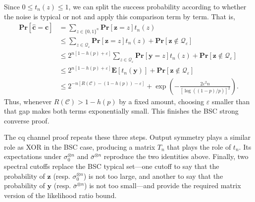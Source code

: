 \documentclass[11pt]{article}
\renewcommand{\leq}{\leqslant}
\theoremstyle{remark}
\newcommand{\cC}{\mathcal{C}}
\newcommand{\Eb}{\mathbf{E}}
\newcommand{\Prb}{\mathbf{Pr}}
\newcommand{\bits}{\{0,1\}}
\newcommand{\bchat}{\hat{\mathbf{c}}}
\newcommand{\bc}{\mathbf{c}}
\newcommand{\by}{\mathbf{y}}
\newcommand{\bz}{\mathbf{z}}
\newcommand{\eps}{\varepsilon}
\begin{document}
Since $0\leq t_n(z)\leq1$, we can split the success probability according to whether the noise is typical or not and apply this comparison term by term. That is,
\begin{align*}
\Prb[\bchat=\bc]
&=\sum_{z\in\bits^n}{\Prb[\bz=z]t_n(z)} \\
&\leq
\sum_{z\in\mathcal{Q}_\eps}{\Prb[\bz=z]t_n(z)}
+\Prb[\bz\notin\mathcal{Q}_\eps] \\
&\leq
2^{n[1-h(p)+\eps]}
\sum_{z\in\mathcal{Q}_\eps}{\Prb[\by=z]t_n(z)}
+\Prb[\bz\notin\mathcal{Q}_\eps] \\
&\leq
2^{n[1-h(p)+\eps]}\Eb[t_n(\by)]
+\Prb[\bz\notin\mathcal{Q}_\eps] \\
&\leq
2^{-n[R(\cC)-(1-h(p))-\eps]}
+
\exp\left(
-\frac{2\eps^2n}{[\log((1-p)/p)]^2}
\right).
\end{align*}
Thus, whenever $R(\cC)>1-h(p)$ by a fixed amount, choosing $\eps$ smaller than that gap makes both terms exponentially small. This finishes the BSC strong converse proof.

The cq channel proof repeats these three steps. Output symmetry plays a similar role as XOR in the BSC case, producing a matrix $T_n$ that plays the role of $t_n$. Its expectations under $\sigma_0^{\otimes n}$ and $\bar{\sigma}^{\otimes n}$ reproduce the two identities above. Finally, two spectral cutoffs replace the BSC typical set---one cutoff to say that the probability of $\bz$ (resp. $\sigma_0^{\otimes n}$) is not too large, and another to say that the probability of $\by$ (resp. $\bar{\sigma}^{\otimes n}$) is not too small---and provide the required matrix version of the likelihood ratio bound.
\end{document}
